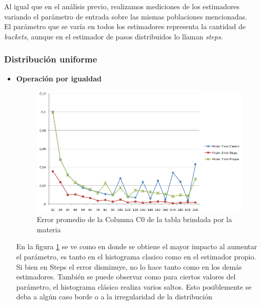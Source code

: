 \quad Al igual que en el an\'alisis previo, realizamos mediciones de los estimadores variando el par\'ametro de entrada sobre las mismas poblaciones mencionadas.\\

\quad El par\'ametro que se var\'ia en todos los estimadores representa la cantidad de \textit{buckets}, aunque en el estimador de pasos distribuidos lo llaman \textit{steps}.

\subsubsection{Distribuci\'on uniforme}

\begin{itemize}
\item \textbf{Operaci\'on por igualdad} \\

\begin{figure}[H]
	  \begin{center}
	    \includegraphics[scale=.80]{imagenes/parametroVariableC0Eq.png}
	    \caption{Error promedio de la Columna C0 de la tabla brindada por la materia} 
	    \label{fig:C0_variando_parametro}
	  \end{center}
\end{figure}

\quad En la figura \ref{fig:C0_variando_parametro} se ve como en donde se obtiene el mayor impacto al aumentar el par\'ametro, es tanto en el histograma clasico como en el estimador propio. Si bien en Steps el error disminuye, no lo hace tanto como en los dem\'as estimadores. Tambi\'en se puede observar como para ciertos valores del par\'ametro, el histograma cl\'asico realiza varios saltos. Esto posiblemente se deba a alg\'un caso borde o a la irregularidad de la distribuci\'on


\end{itemize}
